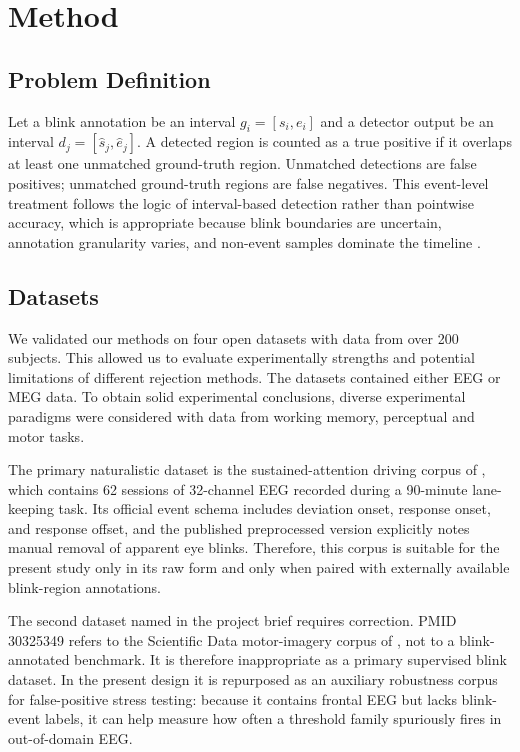 \section{Method}
\label{sec:method}





\subsection{Problem Definition}
\label{sec:eval}

Let a blink annotation be an interval \(g_i = [s_i, e_i]\) and a detector output be an interval \(d_j = [\hat{s}_j, \hat{e}_j]\). A detected region is counted as a true positive if it overlaps at least one unmatched ground-truth region. Unmatched detections are false positives; unmatched ground-truth regions are false negatives. This event-level treatment follows the logic of interval-based detection rather than pointwise accuracy, which is appropriate because blink boundaries are uncertain, annotation granularity varies, and non-event samples dominate the timeline \citep{saito2015precision,salles2024softed}.



\subsection{Datasets}
\label{sec:datasets}
We validated our methods on four open datasets with data from over 200 subjects. This
allowed us to evaluate experimentally strengths and potential limitations of different
rejection methods. The datasets contained either EEG or MEG data. To obtain solid
experimental conclusions, diverse experimental paradigms were considered with data from
working memory, perceptual and motor tasks.


The primary naturalistic dataset is the sustained-attention driving corpus of \citet{cao2019multichannel}, which contains 62 sessions of 32-channel EEG recorded during a 90-minute lane-keeping task. Its official event schema includes deviation onset, response onset, and response offset, and the published preprocessed version explicitly notes manual removal of apparent eye blinks. Therefore, this corpus is suitable for the present study only in its raw form and only when paired with externally available blink-region annotations.

The second dataset named in the project brief requires correction. PMID 30325349 refers to the Scientific Data motor-imagery corpus of \citet{kaya2018large}, not to a blink-annotated benchmark. It is therefore inappropriate as a primary supervised blink dataset. In the present design it is repurposed as an auxiliary robustness corpus for false-positive stress testing: because it contains frontal EEG but lacks blink-event labels, it can help measure how often a threshold family spuriously fires in out-of-domain EEG.


